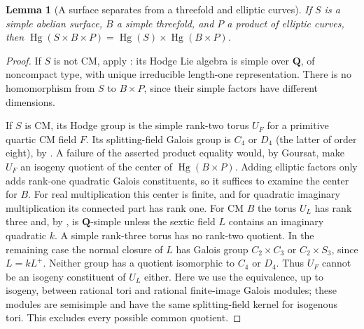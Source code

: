 \documentclass[10pt,reqno]{article}
\theoremstyle{emphasizedplain}
\theoremstyle{emphasizeddefinition}
\theoremstyle{emphasizeddefinition}
\newtheorem{prelemma}{Lemma}
\DeclareMathOperator{\Hg}{Hg}
\newcommand{\Q}{\mathbf Q}
\begin{document}
\begin{prelemma}[A surface separates from a threefold and elliptic curves]
\label{p:surface-three}
If $S$ is a simple abelian surface, $B$ a simple threefold, and $P$ a
product of elliptic curves, then
$\Hg(S\times B\times P)=\Hg(S)\times\Hg(B\times P)$.
\end{prelemma}
\begin{proof}
If $S$ is not CM, apply \cite[Proposition (2.4) and Lemma (3.4)]{MZ}:
its Hodge Lie algebra is simple over $\Q$, of noncompact type, with
unique irreducible length-one representation. There is no homomorphism
from $S$ to $B\times P$, since their simple factors have different dimensions.

If $S$ is CM, its Hodge group is the simple rank-two torus $U_F$ for a
primitive quartic CM field $F$. Its splitting-field Galois group is
$C_4$ or $D_4$ (the latter of order eight), by \cite[\S4]{MZ}.
A failure of the asserted product equality would, by Goursat, make
$U_F$ an isogeny quotient of the center of $\Hg(B\times P)$.
Adding elliptic factors only adds rank-one quadratic Galois constituents,
so it suffices to examine the center for $B$.
For real multiplication this center is finite, and for quadratic
imaginary multiplication its connected part has rank one.
For CM $B$ the torus $U_L$ has rank three and, by
\cite[Proposition (2.4)]{MZ}, is $\Q$-simple unless the sextic field $L$
contains an imaginary quadratic $k$. A simple rank-three torus has no
rank-two quotient. In the remaining case the normal closure of $L$ has
Galois group $C_2\times C_3$ or $C_2\times S_3$, since $L=kL^+$.
Neither group has a quotient isomorphic to $C_4$ or $D_4$.
Thus $U_F$ cannot be an isogeny constituent of $U_L$ either.
Here we use the equivalence, up to isogeny, between rational tori and
rational finite-image Galois modules; these modules are semisimple and
have the same splitting-field kernel for isogenous tori.
This excludes every possible common quotient.
\end{proof}
\end{document}
